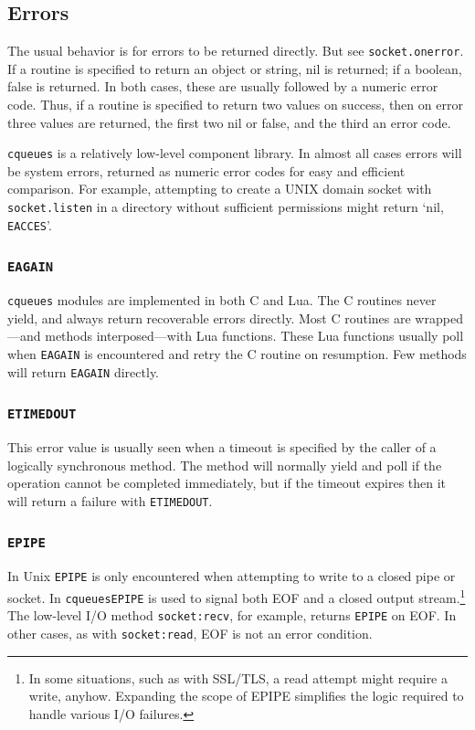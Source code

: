 \documentclass[11pt, oneside]{memoir}
\newcommand*{\cqueues}[0]{\texttt{cqueues}\xspace}
\newcommand*{\routine}[1]{\texttt{#1}\xspace}
\newcommand*{\method}[1]{\texttt{#1}\xspace}
\newcommand*{\errno}[1]{\texttt{#1}\xspace}
\begin{document}
\subsection{Errors}

The usual behavior is for errors to be returned directly. But see \routine{socket.onerror}. If a routine is specified to return an object or string, nil is returned; if a boolean, false is returned. In both cases, these  are usually followed by a numeric error code. Thus, if a routine is specified to return two values on success, then on error three values are returned, the first two nil or false, and the third an error code.

\cqueues is a relatively low-level component library. In almost all cases errors will be system errors, returned as numeric error codes for easy and efficient comparison. For example, attempting to create a UNIX domain socket with \routine{socket.listen} in a directory without sufficient permissions might return `nil, \errno{EACCES}'.

\subsubsection{\texttt{EAGAIN}}

\cqueues modules are implemented in both C and Lua. The C routines never yield, and always return recoverable errors directly. Most C routines are wrapped---and methods interposed---with Lua functions. These Lua functions usually poll when \errno{EAGAIN} is encountered and retry the C routine on resumption. Few methods will return \errno{EAGAIN} directly.

\subsubsection{\texttt{ETIMEDOUT}}

This error value is usually seen when a timeout is specified by the caller of a logically synchronous method. The method will normally yield and poll if the operation cannot be completed immediately, but if the timeout expires then it will return a failure with \errno{ETIMEDOUT}.

\subsubsection{\texttt{EPIPE}}

In Unix \errno{EPIPE} is only encountered when attempting to write to a closed pipe or socket. In \cqueues \errno{EPIPE} is used to signal both EOF and a closed output stream.\footnote{In some situations, such as with SSL/TLS, a read attempt might require a write, anyhow. Expanding the scope of EPIPE simplifies the logic required to handle various I/O failures.} The low-level I/O method \method{socket:recv}, for example, returns \errno{EPIPE} on EOF. In other cases, as with \method{socket:read}, EOF is not an error condition.
\end{document}

